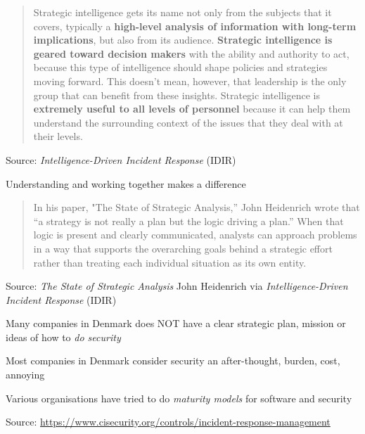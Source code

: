 \documentclass[Screen16to9,17pt]{foils}
\begin{document}
\begin{quote}
Strategic intelligence gets its name not only from the subjects that it covers, typically a {\bf high-level analysis of information with long-term implications}, but also from its audience. {\bf Strategic intelligence is geared toward decision makers} with the ability and authority to act, because this type of intelligence should shape policies and strategies moving forward. This doesn’t mean, however, that leadership is the only group that can benefit from these insights. Strategic intelligence is {\bf extremely useful to all levels of personnel} because it can help them understand the surrounding context of the issues that they deal with at their levels.
\end{quote}
Source: \emph{Intelligence-Driven Incident Response} (IDIR)

\begin{list2}
\item Understanding and working together makes a difference
\end{list2}




\begin{quote}
In his paper, "The State of Strategic Analysis,” John Heidenrich wrote that “a strategy is not really a plan but the logic driving a plan.” When that logic is present and clearly communicated, analysts can approach problems in a way that supports the overarching goals behind a strategic effort rather than treating each individual situation as its own entity.
\end{quote}
Source:
\emph{The State of Strategic Analysis} John Heidenrich via
\emph{Intelligence-Driven Incident Response} (IDIR)

\begin{list2}
\item Many companies in Denmark does NOT have a clear strategic plan, mission or ideas of how to \emph{do security}
\item Most companies in Denmark consider security an after-thought, burden, cost, annoying
\item Various organisations have tried to do \emph{maturity models} for software and security
\end{list2}


Source: \url{https://www.cisecurity.org/controls/incident-response-management}
\end{document}

